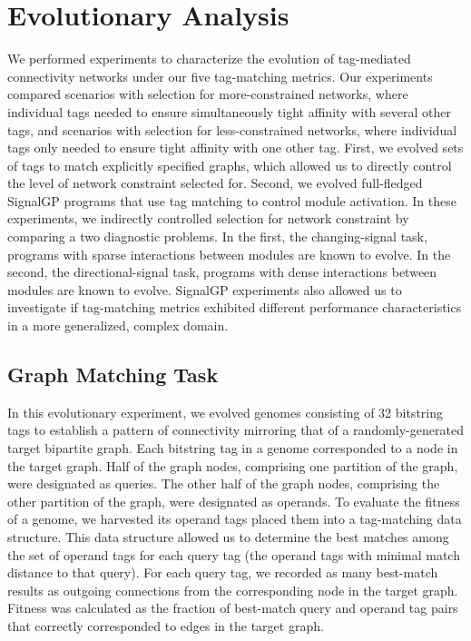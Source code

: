 \section{Evolutionary Analysis}

We performed experiments to characterize the evolution of tag-mediated connectivity networks under our five tag-matching metrics.
Our experiments compared scenarios with selection for more-constrained networks, where individual tags needed to ensure simultaneously tight affinity with several other tags, and scenarios with selection for less-constrained networks, where individual tags only needed to ensure tight affinity with one other tag. 
First, we evolved sets of tags to match explicitly specified graphs, which allowed us to directly control the level of network constraint selected for.
Second, we evolved full-fledged SignalGP programs that use tag matching to control module activation.
In these experiments, we indirectly controlled selection for network constraint by comparing a two diagnostic problems.
In the first, the changing-signal task, programs with sparse interactions between modules are known to evolve.
In the second, the directional-signal task, programs with dense interactions between modules are known to evolve.
SignalGP experiments also allowed us to investigate if tag-matching metrics exhibited different performance characteristics in a more generalized, complex domain.

\subsection{Graph Matching Task}



In this evolutionary experiment, we evolved genomes consisting of 32 bitstring tags to establish a pattern of connectivity mirroring that of a randomly-generated target bipartite graph.
Each bitstring tag in a genome corresponded to a node in the target graph.
Half of the graph nodes, comprising one partition of the graph, were designated as queries.
The other half of the graph nodes, comprising the other partition of the graph, were designated as operands.
To evaluate the fitness of a genome, we harvested its operand tags placed them into a tag-matching data structure.
This data structure allowed us to determine the best matches among the set of operand tags for each query tag (the operand tags with minimal match distance to that query).
For each query tag, we recorded as many best-match results as outgoing connections from the corresponding node in the target graph.
Fitness was calculated as the fraction of best-match query and operand tag pairs that correctly corresponded to edges in the target graph.


